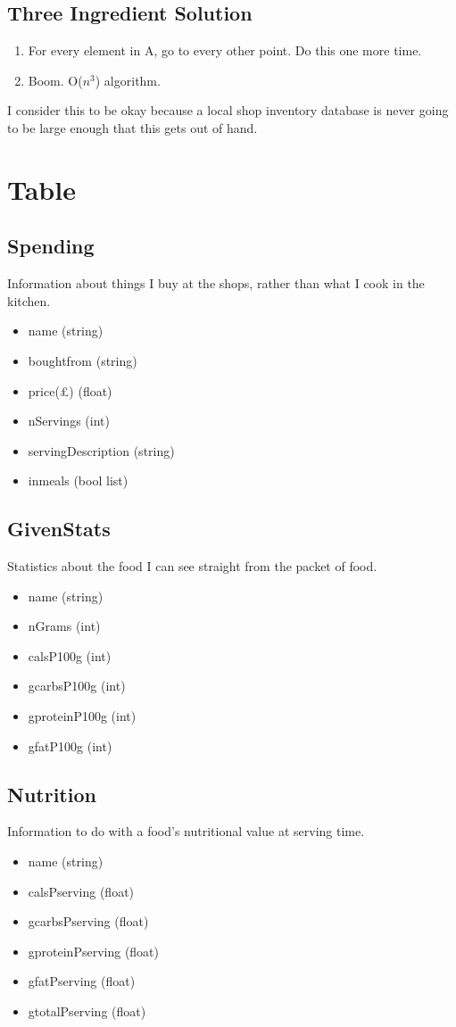 \documentclass[a4paper]{article}
\begin{document}
\subsection{Three Ingredient Solution}

\begin{enumerate}
  \item For every element in A, go to every other point. Do this one more time.
  \item Boom. O($n^{3}$) algorithm.
\end{enumerate}

I consider this to be okay because a local shop inventory database is 
never going to be large enough that this gets out of hand.

\section{Table}

\subsection{Spending}

Information about things I buy at the shops, rather than what I cook in the 
kitchen.

\begin{itemize}
  \item name (string)
  \item boughtfrom (string)
  \item price(£) (float)
  \item nServings (int)
  \item servingDescription (string)
  \item inmeals (bool list)
\end{itemize}

\subsection{GivenStats}

Statistics about the food I can see straight from the packet of food.

\begin{itemize}
  \item name (string)
  \item nGrams (int)
  \item calsP100g (int)
  \item gcarbsP100g (int)
  \item gproteinP100g (int)
  \item gfatP100g (int)
\end{itemize} 
  
\subsection{Nutrition}

Information to do with a food's nutritional value at serving time.

\begin{itemize}
  \item name (string)
  \item calsPserving (float)
  \item gcarbsPserving (float)
  \item gproteinPserving (float)
  \item gfatPserving (float)
  \item gtotalPserving (float)
\end{itemize}
\end{document}
